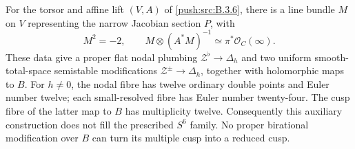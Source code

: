 \begin{proposition}\hypertarget{tag-030B}{}\label{push:src:B.3.7}\label{push:B37}

For the torsor and affine lift $(V,A)$
of \ref{push:src:B.3.6}, there is a line bundle $M$ on
$V$ representing the narrow Jacobian
section $P$, with
\[
 M^2=-2,\qquad
 M\otimes(A^*M)^{-1}
       \simeq\pi^*\mathcal O_C(\infty).
\]
These data give a proper flat nodal
plumbing $\mathcal Z^\flat\to\Delta_h$
and two uniform smooth-total-space
semistable modifications
$\mathcal Z^\pm\to\Delta_h$, together
with holomorphic maps to $B$.
For $h\ne0$, the nodal fibre has
twelve ordinary double points and
Euler number twelve; each small-resolved
fibre has Euler number twenty-four.
The cusp fibre of the latter map to
$B$ has multiplicity twelve.
Consequently this auxiliary construction
does not fill the prescribed $S^6$
family. No proper birational modification
over $B$ can turn its multiple cusp
into a reduced cusp.
\end{proposition}


